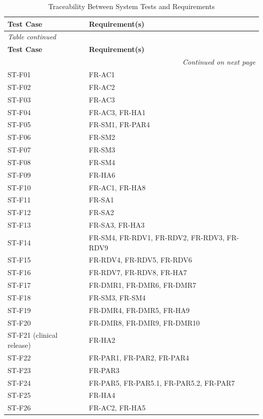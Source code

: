 \documentclass[12pt, titlepage]{article}
\begin{document}
\begin{longtable}{@{}p{}p{}@{}}
\caption{Traceability Between System Tests and Requirements}
\label{tab:system-test-traceability}\\

\toprule
\textbf{Test Case} & \textbf{Requirement(s)} \\
\midrule
\endfirsthead

\multicolumn{2}{l}{\textit{Table continued}}\\
\toprule
\textbf{Test Case} & \textbf{Requirement(s)} \\
\midrule
\endhead

\midrule
\multicolumn{2}{r}{\textit{Continued on next page}}\\
\endfoot

\bottomrule
\endlastfoot

ST-F01 & FR-AC1 \\
ST-F02 & FR-AC2 \\
ST-F03 & FR-AC3 \\
ST-F04 & FR-AC3, FR-HA1 \\
ST-F05 & FR-SM1, FR-PAR4 \\
ST-F06 & FR-SM2 \\
ST-F07 & FR-SM3 \\
ST-F08 & FR-SM4 \\
ST-F09 & FR-HA6 \\
ST-F10 & FR-AC1, FR-HA8 \\
ST-F11 & FR-SA1 \\
ST-F12 & FR-SA2 \\
ST-F13 & FR-SA3, FR-HA3 \\
ST-F14 & FR-SM4, FR-RDV1, FR-RDV2, FR-RDV3, FR-RDV9 \\
ST-F15 & FR-RDV4, FR-RDV5, FR-RDV6 \\
ST-F16 & FR-RDV7, FR-RDV8, FR-HA7 \\
ST-F17 & FR-DMR1, FR-DMR6, FR-DMR7 \\
ST-F18 & FR-SM3, FR-SM4 \\
ST-F19 & FR-DMR4, FR-DMR5, FR-HA9 \\
ST-F20 & FR-DMR8, FR-DMR9, FR-DMR10 \\
ST-F21 (clinical release) & FR-HA2 \\
ST-F22 & FR-PAR1, FR-PAR2, FR-PAR4 \\
ST-F23 & FR-PAR3 \\
ST-F24 & FR-PAR5, FR-PAR5.1, FR-PAR5.2, FR-PAR7 \\
ST-F25 & FR-HA4 \\
ST-F26 & FR-AC2, FR-HA5 \\


\end{longtable}
\end{document}
